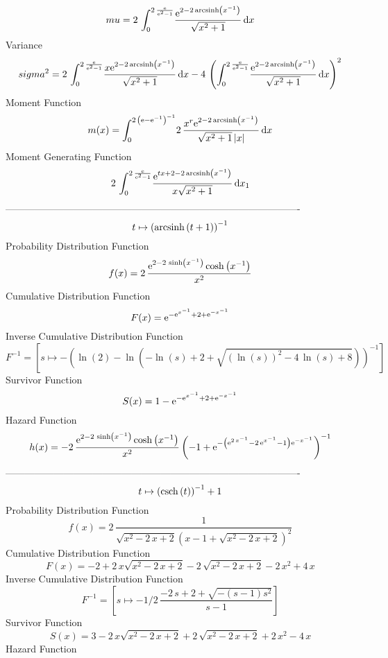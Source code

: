 \documentclass[12pt]{article}
\begin{document}
 $$ mu=2\,\int_{0}^{2\,{\frac {{\rm e}}{{{\rm e}^{2}}-1}}}\!{\frac {{{\rm e}^
{2-2\,{\rm arcsinh} \left({x}^{-1}\right)}}}{\sqrt {{x}^{2}+1}}}
\,{\rm d}x
$$ Variance 
 $$ sigma^2 = 2\,\int_{0}^{2\,{\frac {{\rm e}}{{{\rm e}^{2}}-1}}}\!{\frac {x{{\rm e}
^{2-2\,{\rm arcsinh} \left({x}^{-1}\right)}}}{\sqrt {{x}^{2}+1}}}
\,{\rm d}x-4\, \left( \int_{0}^{2\,{\frac {{\rm e}}{{{\rm e}^{2}}-1}}}
\!{\frac {{{\rm e}^{2-2\,{\rm arcsinh} \left({x}^{-1}\right)}}}{\sqrt 
{{x}^{2}+1}}}\,{\rm d}x \right) ^{2}
$$Moment Function 
 $$ m(x) = \int_{0}^{2\, \left( {\rm e}-{{\rm e}^{-1}} \right) ^{-1}}\!2\,{\frac 
{{x}^{r}{{\rm e}^{2-2\,{\rm arcsinh} \left({x}^{-1}\right)}}}{\sqrt {{
x}^{2}+1} \left| x \right| }}\,{\rm d}x
$$ Moment Generating Function 
 $$2\,\int_{0}^{2\,{\frac {{\rm e}}{{{\rm e}^{2}}-1}}}\!{\frac {{{\rm e}^
{tx+2-2\,{\rm arcsinh} \left({x}^{-1}\right)}}}{x\sqrt {{x}^{2}+1}}}
\,{\rm d}x_{{1}}
$$-------------------------------------------------------------------------------------------  \\$$t\mapsto  \left( {\rm arcsinh} \left(t+1\right) \right) ^{-1}
$$Probability Distribution Function 
$$  f(x)=2\,{\frac {{{\rm e}^{2-2\,\sinh \left( {x}^{-1} \right) }}\cosh
 \left( {x}^{-1} \right) }{{x}^{2}}}
$$Cumulative Distribution Function  
 $$F(x)={{\rm e}^{-{{\rm e}^{{x}^{-1}}}+2+{{\rm e}^{-{x}^{-1}}}}}
$$ Inverse Cumulative Distribution Function 
  $$F^{-1} = [s\mapsto - \left( \ln  \left( 2 \right) -\ln  \left( -\ln  \left( s
 \right) +2+\sqrt { \left( \ln  \left( s \right)  \right) ^{2}-4\,\ln 
 \left( s \right) +8} \right)  \right) ^{-1}]
$$Survivor Function 
 $$ S(x)=1-{{\rm e}^{-{{\rm e}^{{x}^{-1}}}+2+{{\rm e}^{-{x}^{-1}}}}}
$$ Hazard Function 
 $$ h(x)=-2\,{\frac {{{\rm e}^{2-2\,\sinh \left( {x}^{-1} \right) }}\cosh
 \left( {x}^{-1} \right) }{{x}^{2}} \left( -1+{{\rm e}^{- \left( {
{\rm e}^{2\,{x}^{-1}}}-2\,{{\rm e}^{{x}^{-1}}}-1 \right) {{\rm e}^{-{x
}^{-1}}}}} \right) ^{-1}}
$$-------------------------------------------------------------------------------------------  \\$$t\mapsto  \left( {\rm csch} \left(t\right) \right) ^{-1}+1
$$Probability Distribution Function 
$$  f(x)=2\,{\frac {1}{\sqrt {{x}^{2}-2\,x+2} \left( x-1+\sqrt {{x}^{2}-2\,x+2}
 \right) ^{2}}}
$$Cumulative Distribution Function  
 $$F(x)=-2+2\,x\sqrt {{x}^{2}-2\,x+2}-2\,\sqrt {{x}^{2}-2\,x+2}-2\,{x}^{2}+4\,
x
$$ Inverse Cumulative Distribution Function 
  $$F^{-1} =   
[s\mapsto -1/2\,{\frac {-2\,s+2+\sqrt {- \left( s-1 \right) {s}^{2}}}{
s-1}}]
$$Survivor Function 
 $$ S(x)=3-2\,x\sqrt {{x}^{2}-2\,x+2}+2\,\sqrt {{x}^{2}-2\,x+2}+2\,{x}^{2}-4\,x
$$ Hazard Function 
\end{document}

